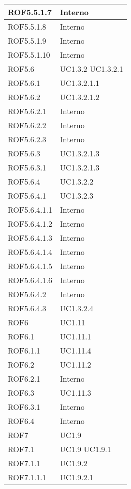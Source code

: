 \begin{center}
\begin{longtable}{| p{4cm} | p{4cm} |}
\hline
ROF5.5.1.7   &  Interno \\
\hline
ROF5.5.1.8   &  Interno \\
\hline
ROF5.5.1.9   &  Interno \\
\hline
ROF5.5.1.10   &  Interno \\
\hline
ROF5.6   &  UC1.3.2 \newline UC1.3.2.1 \\
\hline
ROF5.6.1   &  UC1.3.2.1.1 \\
\hline
ROF5.6.2   &  UC1.3.2.1.2 \\
\hline
ROF5.6.2.1   &  Interno \\
\hline
ROF5.6.2.2   &  Interno \\
\hline
ROF5.6.2.3   &  Interno \\
\hline
ROF5.6.3   &  UC1.3.2.1.3 \\
\hline
ROF5.6.3.1   &  UC1.3.2.1.3 \\
\hline
ROF5.6.4   &  UC1.3.2.2 \\
\hline
ROF5.6.4.1   &  UC1.3.2.3 \\
\hline
ROF5.6.4.1.1   &  Interno \\
\hline
ROF5.6.4.1.2   &  Interno \\
\hline
ROF5.6.4.1.3   &  Interno \\
\hline
ROF5.6.4.1.4   &  Interno \\
\hline
ROF5.6.4.1.5   &  Interno \\
\hline
ROF5.6.4.1.6   &  Interno \\
\hline
ROF5.6.4.2   &  Interno \\
\hline
ROF5.6.4.3   &  UC1.3.2.4 \\
\hline
ROF6   &  UC1.11 \\
\hline
ROF6.1   &  UC1.11.1 \\
\hline
ROF6.1.1   &  UC1.11.4 \\
\hline
ROF6.2   &  UC1.11.2 \\
\hline
ROF6.2.1   &  Interno \\
\hline
ROF6.3   &  UC1.11.3 \\
\hline
ROF6.3.1   &  Interno \\
\hline
ROF6.4   &  Interno \\
\hline
ROF7   &  UC1.9 \\
\hline
ROF7.1   &  UC1.9 \newline UC1.9.1 \\
\hline
ROF7.1.1   &  UC1.9.2  \\
\hline
ROF7.1.1.1   &  UC1.9.2.1 \\

\end{longtable}
\end{center}
